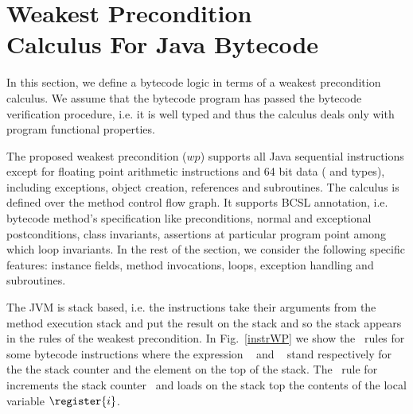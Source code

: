 
\section{Weakest Precondition \\Calculus For Java Bytecode}\label{wpbc}
In this section, we define a bytecode logic in terms of a weakest precondition calculus.
We assume that the bytecode program has passed the bytecode verification procedure, i.e. it is well typed and
 thus the calculus deals only with program functional properties. %

The proposed weakest precondition ($wp$) supports all Java sequential instructions except for floating point
 arithmetic instructions and 64 bit data ( and  types), including exceptions, object creation, references and subroutines. The calculus is defined over the method control flow graph. It supports BCSL annotation, i.e. bytecode method's specification
 like preconditions, normal and exceptional postconditions, class invariants, assertions at particular program point among which
 loop invariants. In the rest of the section, we consider the following specific features: instance fields, method invocations, 
loops, exception handling and subroutines. 

The JVM is stack based, i.e. the instructions take their arguments from the method execution stack and 
 put the result on the stack and so the stack appears in the rules of the weakest precondition.
 In Fig.~\ref{instrWP} we show the \wpi \ rules for some bytecode instructions where the expression
 \counter~ and  \stack{\counter}~ stand respectively for the the stack counter and the element on the top of the stack. 
 The \wpi \ rule for   increments the stack counter \counter \ and loads on the stack top the contents
 of the local variable $\register{i}$. 


